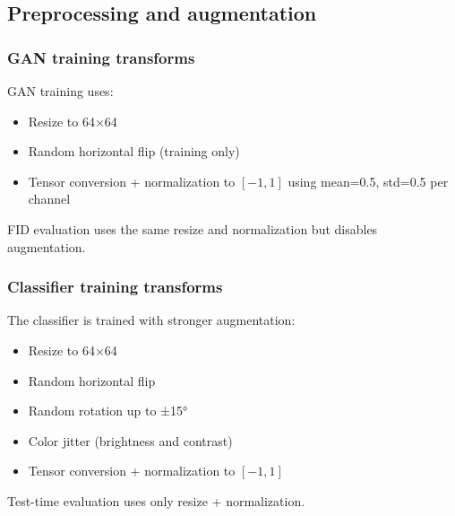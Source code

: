 \subsection{Preprocessing and augmentation}

\subsubsection{GAN training transforms}

GAN training uses:
\begin{itemize}
\item Resize to 64×64
\item Random horizontal flip (training only)
\item Tensor conversion + normalization to \([-1, 1]\) using mean=0.5, std=0.5 per channel
\end{itemize}

FID evaluation uses the same resize and normalization but disables augmentation.

\subsubsection{Classifier training transforms}

The classifier is trained with stronger augmentation:
\begin{itemize}
\item Resize to 64×64
\item Random horizontal flip
\item Random rotation up to ±15°
\item Color jitter (brightness and contrast)
\item Tensor conversion + normalization to \([-1, 1]\)
\end{itemize}

Test-time evaluation uses only resize + normalization.
